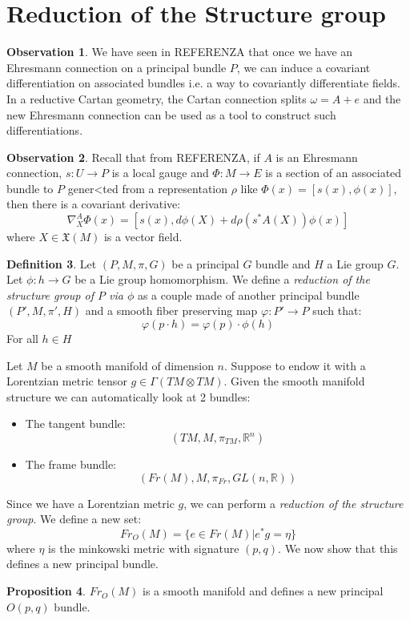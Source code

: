 \documentclass[12pt,a4paper]{report}
\theoremstyle{definition}
\newtheorem{Def}{Definition}[chapter]
\theoremstyle{Theorem}
\newtheorem{Prop}[Def]{Proposition}
\theoremstyle{definition}
\theoremstyle{definition}
\newtheorem{Obs}[Def]{Observation}
\begin{document}
	\section{Reduction of the Structure group}
	\begin{Obs}
		We have seen in REFERENZA that once we have an Ehresmann connection on a principal bundle $P$, we can induce a covariant differentiation on associated bundles i.e. a way to covariantly differentiate fields. In a reductive Cartan geometry, the Cartan connection splits $\omega=A+e$ and the new Ehresmann connection can be used as a tool to construct such differentiations.
	\end{Obs}
	\begin{Obs}
		Recall that from REFERENZA, if $A$ is an Ehresmann connection, $s:U\rightarrow P$ is a local gauge and $\Phi:M\rightarrow E$ is a section of an associated bundle to $P$ gener<ted from a representation $\rho$ like $\Phi(x)=[s(x), \phi(x)]$, then there is a covariant derivative:
		$$\nabla^A_X\Phi(x)=[s(x),d\phi(X)+d\rho(s^*A(X))\phi(x)]$$
		where $X\in\mathfrak{X}(M)$ is a vector field.
	\end{Obs}
	\begin{Def}
		Let $(P,M,\pi,G)$ be a principal $G$ bundle and $H$ a Lie group $G$. Let $\phi:h\rightarrow G$ be a Lie group homomorphism. We define a \textit{reduction of the structure group of $P$ via $\phi$} as a couple made of another principal bundle $(P',M,\pi',H)$ and a smooth fiber preserving map $\varphi: P'\rightarrow P$ such that:
		$$\varphi(p\cdot h)=\varphi(p)\cdot \phi(h)$$
		For all $h\in H$
	\end{Def}
		Let $M$ be a smooth manifold of dimension $n$. Suppose to endow it with a Lorentzian metric tensor $g\in\Gamma(TM\otimes TM)$. Given the smooth manifold structure we can automatically look at 2 bundles:
		\begin{itemize}
			\item[1] The tangent bundle:
			$$(TM,M,\pi_{TM},\mathbb{R}^n)$$
			\item[2] The frame bundle:
			$$(Fr(M),M,\pi_{Fr},GL(n,\mathbb{R}))$$
		\end{itemize}
		Since we have a Lorentzian metric $g$, we can perform a \textit{reduction of the structure group}. We define a new set:
		$$Fr_O(M)=\{e\in Fr(M)|e^*g=\eta\}$$
		where $\eta$ is the minkowski metric with signature $(p,q)$. We now show that this defines a new principal bundle.
		\begin{Prop}
			$Fr_O(M)$ is a smooth manifold and defines a new principal $O(p,q)$ bundle.
		\end{Prop}
\end{document}
